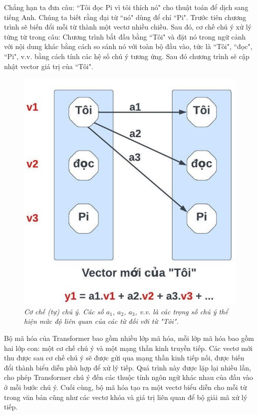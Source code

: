 \begin{multicols}{2}
	\vskip 0.1cm
	Chẳng hạn ta đưa câu: ``Tôi đọc Pi vì tôi thích nó" cho thuật toán để dịch sang tiếng Anh. Chúng ta biết rằng đại từ ``nó" dùng để chỉ ``Pi". Trước tiên chương trình sẽ biến đổi mỗi từ thành một vectơ nhiều chiều. Sau đó, cơ chế chú ý xử lý từng từ trong câu: Chương trình bắt đầu bằng ``Tôi" và đặt nó trong ngữ cảnh với nội dung khác bằng cách so sánh nó với toàn bộ đầu vào, tức là ``Tôi", ``đọc", ``Pi", v.v. bằng cách tính các hệ số chú ý tương ứng. Sau đó chương trình sẽ cập nhật vector giá trị của ``Tôi".
	\begin{figure}[H]
		\vspace*{-5pt}
		\centering
		\captionsetup{labelformat= empty, justification=centering}
		\includegraphics[width= 1\linewidth]{Attention.jpeg}
		\caption{\small\textit{\color{timhieukhoahoc}Cơ chế (tự) chú ý. Các số $a_1$, $a_2$, $a_3$, v.v. là các trọng số chú ý thể hiện mức độ liên quan của các từ đối với từ "Tôi".}}
		\vspace*{-5pt}
	\end{figure}
	Bộ mã hóa của Transformer bao gồm nhiều lớp mã hóa, mỗi lớp mã hóa bao gồm hai lớp con: một cơ chế chú ý và một mạng thần kinh truyền tiếp. Các vectơ mới thu được sau cơ chế chú ý sẽ được gửi qua mạng thần kinh tiếp nối, được biến đổi thành biểu diễn phù hợp để xử lý tiếp. Quá trình này được lặp lại nhiều lần, cho phép Transformer chú ý đến các thuộc tính ngôn ngữ khác nhau của đầu vào ở mỗi bước chú ý. Cuối cùng, bộ mã hóa tạo ra một vectơ biểu diễn cho mỗi từ trong văn bản cũng như các vectơ khóa và giá trị liên quan để bộ giải mã xử lý tiếp.

\end{multicols}
